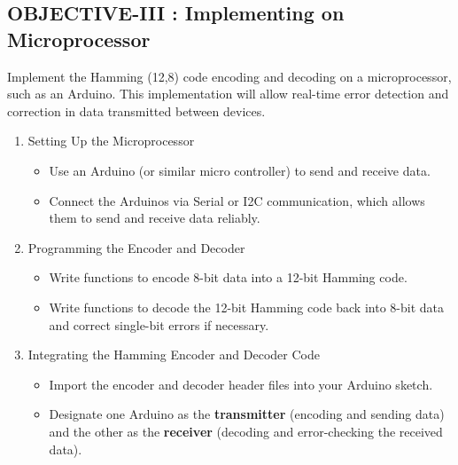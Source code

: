 \documentclass{article}
\numberwithin{equation}{section}
\numberwithin{figure}{section}
\numberwithin{table}{section}
\begin{document}
   






 
    



\subsection{OBJECTIVE-III : Implementing on Microprocessor}
Implement the Hamming (12,8) code encoding and decoding on a microprocessor, such as an Arduino. This implementation will allow real-time error detection and correction in data transmitted between devices.
\begin{enumerate}
    \item {Setting Up the Microprocessor}
        \begin{itemize}
        \item Use an Arduino (or similar micro controller) to send and receive data.
        \item Connect the Arduinos via Serial or I2C communication, which allows them to send and receive data reliably.
        \end{itemize}
    \item{Programming the Encoder and Decoder}
    \begin{itemize}
        \item Write functions to encode 8-bit data into a 12-bit Hamming code.
        \item Write functions to decode the 12-bit Hamming code back into 8-bit data and correct single-bit errors if necessary.
    \end{itemize}
    \item {Integrating the Hamming Encoder and Decoder Code}
    \begin{itemize}
    \item Import the encoder and decoder header files into your Arduino sketch.
    \item Designate one Arduino as the \textbf{transmitter} (encoding and sending data) and the other as the \textbf{receiver} (decoding and error-checking the received data).
    \end{itemize}
\end{enumerate}
\end{document}
